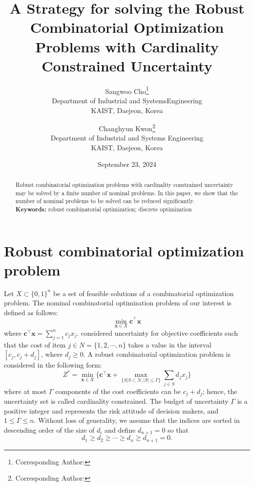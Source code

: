 \documentclass[letterpaper, 10pt]{article}
\title{A Strategy for solving the Robust Combinatorial Optimization Problems with Cardinality Constrained Uncertainty}
\author{
    Sangwoo Cho\footnote{Corresponding Author: \email{jswself@kaist.ac.kr}}\\Department of Industrial and SystemsEngineering\\KAIST, Daejeon, Korea\\
    \and
    Changhyun Kwon\footnote{Corresponding Author: \email{chkwon@kaist.ac.kr}}\\Department of Industrial and Systems Engineering\\KAIST, Daejeon, Korea
    }
\date{September 23, 2024}
\renewcommand{\vec}[1]{\bm{#1}}
\begin{document}
\maketitle

\begin{abstract}
Robust combinatorial optimization problems with cardinality constrained uncertainty may be solved by a finite number of nominal problems. In this paper, we show that the number of nominal problems to be solved can be reduced significantly. \\[0.5em]
\noindent\textbf{Keywords:} robust combinatorial optimization; discrete optimization
\end{abstract}







\section{Robust combinatorial optimization problem}
\label{sec:2}

Let $X \subset \{0, 1\}^n$ be a set of feasible solutions of a combinatorial optimization problem. The nominal combinatorial optimization problem of our interest is defined as follows:
\begin{equation}
\min_{\vec{x}\in X} \vec{c}^\top \vec{x}
\end{equation}
where $\vec{c}^\top \vec{x} = \sum_{j=1}^n c_j x_j$. \citet{Bertsimas2003} considered uncertainty for objective coefficients such that the cost of item $j \in N =\{1,2,\cdots,n\}$ takes a value in the interval $[c_j, c_j + d_j]$, where $d_j \geq 0$. A robust combinatorial optimization problem is considered in the following form:
\begin{equation} \label{problem}
Z^* = \min_{\vec{x}\in X} \bigg\{\vec{c}^\top \vec{x} + \max_{\{S|S \subset N, |S| \leq \Gamma\}} \sum_{j \in S} d_j x_j \bigg\}
\end{equation}
where at most $\Gamma$ components of the cost coefficients can be $c_j+d_j$; hence, the uncertainty set is called cardinality constrained. The budget of uncertainty $\Gamma$ is a positive integer and represents the risk attitude of decision makers, and $1 \leq \Gamma \leq n$. Without loss of generality, we assume that the indices are sorted in descending order of the size of $d_i$ and define $d_{n+1}=0$ so that 
\begin{equation}
	d_1 \geq d_2 \geq \cdots \geq d_n \geq d_{n+1} = 0.
\end{equation}
\end{document}
